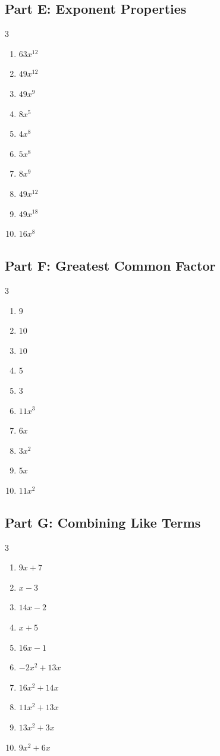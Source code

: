 \documentclass[11pt]{article}
\begin{document}
\subsection*{Part E: Exponent Properties}
\begin{multicols}{3}
\begin{enumerate}
  \item $63 x^{12}$
  \item $49 x^{12}$
  \item $49 x^{9}$
  \item $8 x^{5}$
  \item $4 x^{8}$
  \item $5 x^{8}$
  \item $8 x^{9}$
  \item $49 x^{12}$
  \item $49 x^{18}$
  \item $16 x^{8}$
\end{enumerate}
\end{multicols}
\subsection*{Part F: Greatest Common Factor}
\begin{multicols}{3}
\begin{enumerate}
  \item $9$
  \item $10$
  \item $10$
  \item $5$
  \item $3$
  \item $11 x^{3}$
  \item $6 x$
  \item $3 x^{2}$
  \item $5 x$
  \item $11 x^{2}$
\end{enumerate}
\end{multicols}
\subsection*{Part G: Combining Like Terms}
\begin{multicols}{3}
\begin{enumerate}
  \item $9 x + 7$
  \item $x - 3$
  \item $14 x - 2$
  \item $x + 5$
  \item $16 x - 1$
  \item $- 2 x^{2} + 13 x$
  \item $16 x^{2} + 14 x$
  \item $11 x^{2} + 13 x$
  \item $13 x^{2} + 3 x$
  \item $9 x^{2} + 6 x$
\end{enumerate}
\end{multicols}
\end{document}
